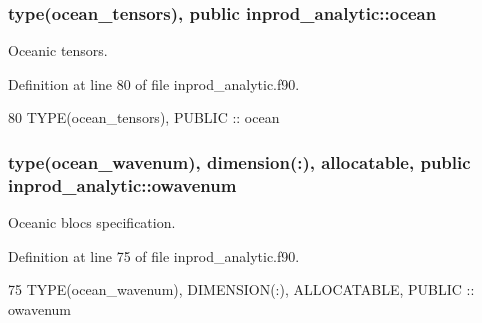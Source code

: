 \subsubsection[{\texorpdfstring{ocean}{ocean}}]{\setlength{\rightskip}{0pt plus 5cm}type({\bf ocean\+\_\+tensors}), public inprod\+\_\+analytic\+::ocean}\hypertarget{namespaceinprod__analytic_ac691a1258fb0a341e2ba5b4811be1c0b}{}\label{namespaceinprod__analytic_ac691a1258fb0a341e2ba5b4811be1c0b}


Oceanic tensors. 



Definition at line 80 of file inprod\+\_\+analytic.\+f90.


\begin{DoxyCode}
80   \textcolor{keywordtype}{TYPE}(ocean\_tensors), \textcolor{keywordtype}{PUBLIC} :: ocean
\end{DoxyCode}
\subsubsection[{\texorpdfstring{owavenum}{owavenum}}]{\setlength{\rightskip}{0pt plus 5cm}type({\bf ocean\+\_\+wavenum}), dimension(\+:), allocatable, public inprod\+\_\+analytic\+::owavenum}\hypertarget{namespaceinprod__analytic_a7273713c6b1a079e1c653e8b8d2fe089}{}\label{namespaceinprod__analytic_a7273713c6b1a079e1c653e8b8d2fe089}


Oceanic blocs specification. 



Definition at line 75 of file inprod\+\_\+analytic.\+f90.


\begin{DoxyCode}
75   \textcolor{keywordtype}{TYPE}(ocean\_wavenum), \textcolor{keywordtype}{DIMENSION(:)}, \textcolor{keywordtype}{ALLOCATABLE}, \textcolor{keywordtype}{PUBLIC} :: owavenum 
\end{DoxyCode}
